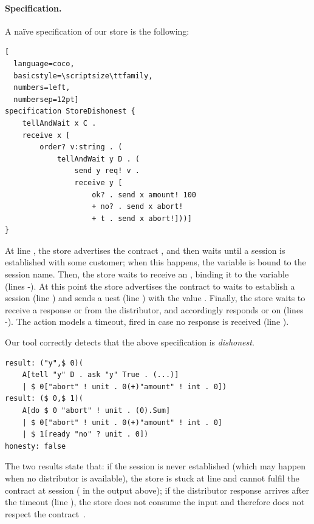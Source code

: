 \paragraph{Specification.}
A naïve \coco specification of our store is the following:
\begin{lstlisting}[
  language=coco,
  basicstyle=\scriptsize\ttfamily,
  numbers=left,
  numbersep=12pt]
specification StoreDishonest {
    tellAndWait x C .
    receive x [
        order? v:string . (
            tellAndWait y D . (
                send y req! v .
                receive y [
                    ok? . send x amount! 100
                    + no? . send x abort!
                    + t . send x abort!]))]
}
\end{lstlisting}

At line , the store advertises the contract ,
and then waits until a session is established with some customer;
when this happens, the variable  is bound to the session name.
Then, the store waits to receive an , 
binding it to the variable  (lines -).
At this point the store advertises the contract  to 
waits to establish a session
 (line ) and sends a uest (line ) with
the value .
Finally, the store waits to receive a response  or  from the distributor,
and accordingly responds  or  on  
(lines -). 
The action  models a timeout, 
fired in case no response is received (line ).

Our tool correctly detects that the above specification is \emph{dishonest}.
\begin{lstlisting}[basicstyle=\scriptsize\ttfamily]
result: ("y",$ 0)(
    A[tell "y" D . ask "y" True . (...)] 
    | $ 0["abort" ! unit . 0(+)"amount" ! int . 0])
result: ($ 0,$ 1)(
    A[do $ 0 "abort" ! unit . (0).Sum] 
    | $ 0["abort" ! unit . 0(+)"amount" ! int . 0] 
    | $ 1[ready "no" ? unit . 0])
honesty: false
\end{lstlisting}
The two results state that: 
if the session 
is never established (which may happen when no distributor is available), 
the store is stuck at line 
and cannot fulfil the contract  at session  ( in the output above);
if the distributor response arrives after the timeout (line ),
the store does not consume the input and 
therefore does not respect the contract~.

